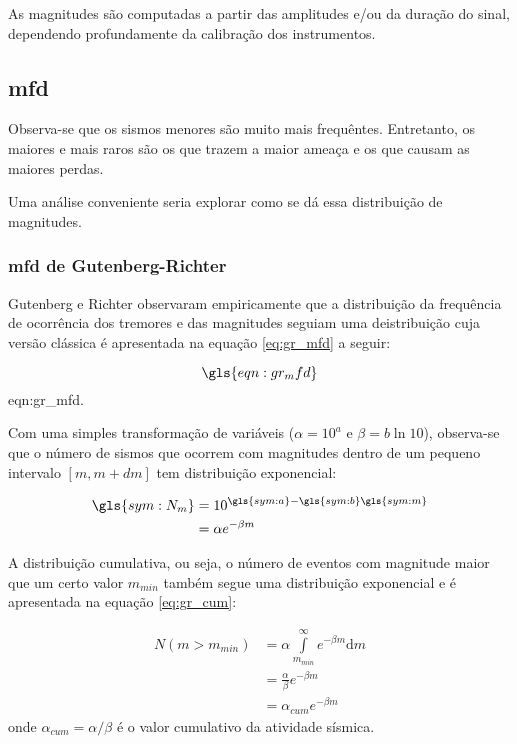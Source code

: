 As magnitudes são computadas a partir das amplitudes e/ou da duração do sinal, dependendo profundamente da calibração dos
instrumentos.

\subsection{\glsdesc{mfd}}
\label{sec:mfd}

Observa-se que os sismos menores são muito mais frequêntes.
Entretanto, os maiores e mais raros são os que trazem a maior ameaça e os que causam as maiores perdas.

Uma análise conveniente seria explorar como se dá essa distribuição de magnitudes.

\subsubsection{\gls{mfd} de Gutenberg-Richter}
\label{sec:grmfd}

Gutenberg e Richter \citep{gr_1954} observaram empiricamente que a distribuição da frequência de ocorrência dos tremores e das
magnitudes seguiam uma deistribuição cuja versão clássica é apresentada na equação \ref{eq:gr_mfd} a seguir:

\begin{equation}
	\gls{eqn:gr_mfd}
	\label{eq:gr_mfd}
\end{equation}
\glsdesc*{eqn:gr_mfd}.

Com uma simples transformação de variáveis ($\alpha = 10^a$ e $\beta = b\ln{10}$), observa-se que o número de sismos que ocorrem 
com magnitudes dentro de um pequeno intervalo $[m, m+dm]$ tem distribuição exponencial:

\begin{equation}
	\begin{split}
		\gls{sym:N_m} &= 10^{\gls{sym:a} - \gls{sym:b}\gls{sym:m}} \\
					  &= \alpha e^{-\beta m}
	\end{split}
	\label{eq:gr_exp}
\end{equation}

A distribuição cumulativa, ou seja, o número de eventos com magnitude maior que um certo valor $m_{min}$ também segue uma
distribuição exponencial e é apresentada na equação \ref{eq:gr_cum}:

\begin{equation}
	\begin{split}
		N(m > m_{min}) &= \alpha \int\limits_{m_{min}}^{\infty}e^{-\beta m}\mathrm{d}m \\
					   &= \frac{\alpha}{\beta} e^{-\beta m} \\
					   &= \alpha_{cum} e^{-\beta m}
	\end{split}
	\label{eq:gr_cum}
\end{equation}
onde $\alpha_{cum} = \alpha / \beta $ é o valor cumulativo da atividade sísmica.


